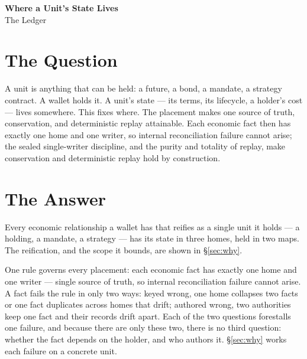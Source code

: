 \documentclass[11pt,a4paper]{article}
\begin{document}
\begin{center}
{\Large\bfseries Where a Unit's State Lives}\\[0.2ex]
{\normalsize The Ledger}
\end{center}
\vspace{0.4ex}

\section{The Question}

A unit is anything that can be held: a future, a bond, a mandate, a strategy
contract. A wallet holds it. A unit's state --- its terms, its lifecycle, a
holder's cost --- lives somewhere. This fixes where. The placement makes one source
of truth, conservation, and deterministic replay attainable. Each economic fact then
has exactly one home and one writer, so internal reconciliation failure cannot arise;
the sealed single-writer discipline, and the purity and totality of replay, make
conservation and deterministic replay hold by construction.

\section{The Answer}
\label{sec:answer}

Every economic relationship a wallet has that reifies as a single unit it holds --- a
holding, a mandate, a strategy --- has its state in three homes, held in two maps. The
reification, and the scope it bounds, are shown in \S\ref{sec:why}.

One rule governs every placement: each economic fact has exactly one home and one
writer --- single source of truth, so internal reconciliation failure cannot arise. A
fact fails the rule in only two ways: keyed wrong, one home collapses two facts or one
fact duplicates across homes that drift; authored wrong, two authorities keep one fact
and their records drift apart. Each of the two questions forestalls one failure, and
because there are only these two, there is no third question: whether the fact depends
on the holder, and who authors it. \S\ref{sec:why} works each failure on a concrete
unit.
\end{document}
